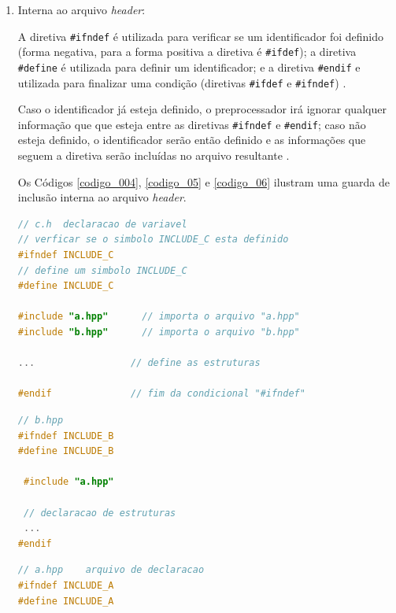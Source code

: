 \begin{enumerate}
\item Interna ao arquivo \textit{header}:

A diretiva \texttt{\#ifndef} é utilizada para verificar se um identificador foi 
 definido (forma negativa, para a forma positiva a diretiva é \texttt{\#ifdef}); a 
diretiva \texttt{\#define} é utilizada para definir um identificador; e a diretiva 
\texttt{\#endif} e utilizada para finalizar  uma condição (diretivas \texttt{\#ifdef} e 
\texttt{\#ifndef}) \cite{ref42}.

Caso o identificador já esteja definido, o preprocessador irá ignorar 
qualquer informação que que esteja entre as diretivas \texttt{\#ifndef}  e \texttt{\#endif};
 caso não esteja definido, o identificador serão então definido e as informações
 que seguem a diretiva serão incluídas no arquivo resultante \cite[pág. 80]{ref42}.

Os Códigos \ref{codigo_004}, \ref{codigo_05} e \ref{codigo_06} ilustram uma 
guarda de inclusão interna ao arquivo \textit{header}.

\begin{lstlisting}[language=C++,caption={
						Arquivo c.hpp contendo guardas de inclusão interna},
                                                            label=codigo_004]
// c.h  declaracao de variavel
// verficar se o simbolo INCLUDE_C esta definido
#ifndef INCLUDE_C   
// define um simbolo INCLUDE_C
#define INCLUDE_C   

#include "a.hpp"      // importa o arquivo "a.hpp"
#include "b.hpp"      // importa o arquivo "b.hpp"

...                 // define as estruturas

#endif              // fim da condicional "#ifndef" 
\end{lstlisting}

\begin{lstlisting}[language=C++,caption={
                                     Arquivo b.hpp que inclue o arquivo a.h},
                                                            label=codigo_05]
// b.hpp
#ifndef INCLUDE_B
#define INCLUDE_B

 #include "a.hpp"

 // declaracao de estruturas 
 ...
#endif    
\end{lstlisting}

\begin{lstlisting}[language=C++,caption={
                        Arquivo a.hpp contendo guardas de inclusão interna},
                                                            label=codigo_06]
// a.hpp    arquivo de declaracao
#ifndef INCLUDE_A
#define INCLUDE_A


\end{lstlisting}
\end{enumerate}
